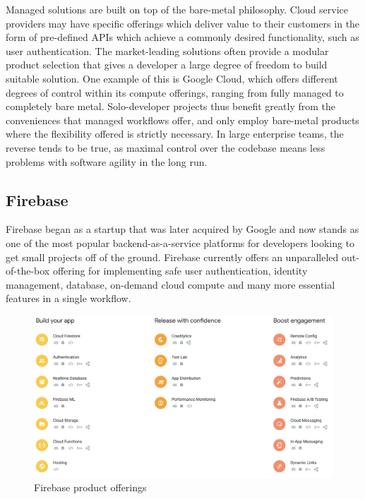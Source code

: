 Managed solutions are built on top of the bare-metal philosophy. Cloud service providers may have specific offerings which deliver value to their customers in the form of pre-defined APIs which achieve a commonly desired functionality, such as user authentication. The market-leading solutions often provide a modular product selection that gives a developer a large degree of freedom to build suitable solution. One example of this is Google Cloud, which offers different degrees of control within its compute offerings, ranging from fully managed to completely bare metal. Solo-developer projects thus benefit greatly from the conveniences that managed workflows offer, and only employ bare-metal products where the flexibility offered is strictly necessary. In large enterprise teams, the reverse tends to be true, as maximal control over the codebase means less problems with software agility in the long run.

\subsection{Firebase}
Firebase began as a startup that was later acquired by Google and now stands as one of the most popular backend-as-a-service platforms for developers looking to get small projects off of the ground. Firebase currently offers an unparalleled out-of-the-box offering for implementing safe user authentication, identity management, database, on-demand cloud compute and many more essential features in a single workflow.

\begin{figure}[h]
    \begin{center}
        \includegraphics[scale=0.3]{images/firebase_offerings.png}
    \end{center}
    \caption{Firebase product offerings}
    \label{firebase_compute_offerings}
\end{figure}

